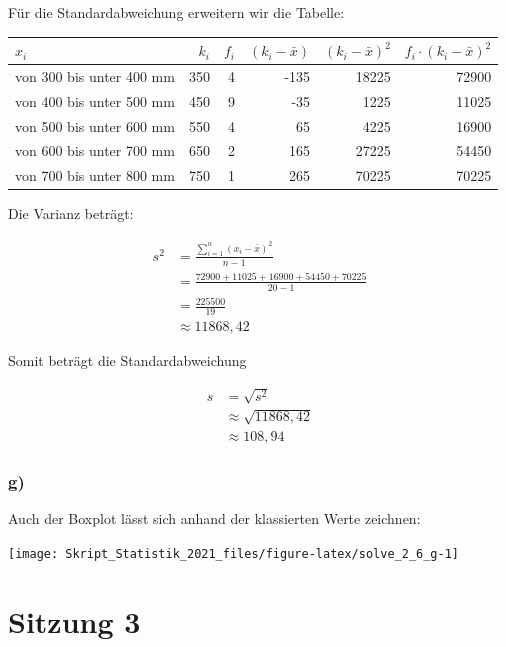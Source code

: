 \documentclass[
  11pt,
  ngerman,
  a4paper,
]{report}
\begin{document}
Für die Standardabweichung erweitern wir die Tabelle:

\begin{table}[H]
\centering
\begin{tabular}{lrrrrr}
\toprule
\textbf{$x_i$} & \textbf{$k_i$} & \textbf{$f_i$} & \textbf{$(k_i - \bar{x})$} & \textbf{$(k_i - \bar{x})^2$} & \textbf{$f_i \cdot (k_i - \bar{x})^2$}\\
\midrule
von 300 bis unter 400 mm & 350 & 4 & -135 & 18225 & 72900\\
von 400 bis unter 500 mm & 450 & 9 & -35 & 1225 & 11025\\
von 500 bis unter 600 mm & 550 & 4 & 65 & 4225 & 16900\\
von 600 bis unter 700 mm & 650 & 2 & 165 & 27225 & 54450\\
von 700 bis unter 800 mm & 750 & 1 & 265 & 70225 & 70225\\
\bottomrule
\end{tabular}
\end{table}

Die Varianz beträgt:

\[\begin{aligned}
  s^2&=\frac{\sum\limits_{i=1}^{n}(x_{i}-\bar{x})^2}{n-1} \\
     &=\frac{72900+11025+16900+54450+70225}{20-1}\\
     &=\frac{225500}{19}\\
     &\approx{11868{,}42}
\end{aligned}\]

Somit beträgt die Standardabweichung

\[\begin{aligned}
  s&=\sqrt{s^2}\\
   &\approx\sqrt{11868{,}42}\\
   &\approx108{,}94
\end{aligned}\]

\hypertarget{g}{%
\subsubsection{g)}\label{g}}

Auch der Boxplot lässt sich anhand der klassierten Werte zeichnen:

\begin{center}\texttt{[image: Skript\_Statistik\_2021\_files/figure-latex/solve\_2\_6\_g-1]} \end{center}

\hypertarget{sitzung-3}{%
\section*{Sitzung 3}\label{sitzung-3}}
\end{document}
